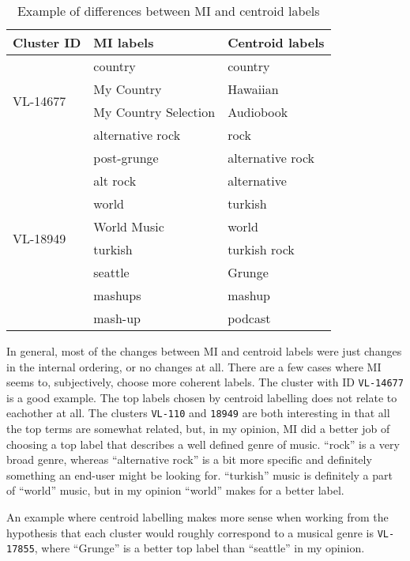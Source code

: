 \documentclass[letterpaper, 10 pt, conference]{ieeeconf}
\begin{document}
\begin{table}
\centering
 \begin{tabular}{ |l|l|l| }
  \hline
  Cluster ID & MI labels & Centroid labels \\
  \hline
  \multirow{4}{*}{VL-14677} & country & country \\
   & My Country & Hawaiian \\
   & My Country Selection & Audiobook \\
  \hline
  \multirow{4}{*}{VL-110} & alternative rock & rock \\
   & post-grunge & alternative rock \\
   & alt rock & alternative \\
  \hline
  \multirow{4}{*}{VL-18949} & world & turkish \\
   & World Music & world \\
   & turkish & turkish rock \\
  \hline
  \multirow{4}{*}{VL-17855} & seattle & Grunge \\
   & mashups & mashup \\
   & mash-up & podcast \\
  \hline
 \end{tabular}
 \caption{Example of differences between MI and centroid labels}
 \label{tbl:labeldiff}
\end{table}

In general, most of the changes between MI and centroid labels were just changes
in the internal ordering, or no changes at all. There are a few cases where MI
seems to, subjectively, choose more coherent labels. The cluster with ID
\texttt{VL-14677} is a good example. The top labels chosen by centroid labelling
does not relate to eachother at all. The clusters \texttt{VL-110} and
\texttt{18949} are both interesting in that all the top terms are somewhat
related, but, in my opinion, MI did a better job of choosing a top label that
describes a well defined genre of music. ``rock'' is a very broad genre, whereas
``alternative rock'' is a bit more specific and definitely something an end-user
might be looking for. ``turkish'' music is definitely a part of ``world'' music,
but in my opinion ``world'' makes for a better label.

An example where centroid labelling makes more sense when working from the
hypothesis that each cluster would roughly correspond to a musical genre is
\texttt{VL-17855}, where ``Grunge'' is a better top label than ``seattle'' in my
opinion.
\end{document}
